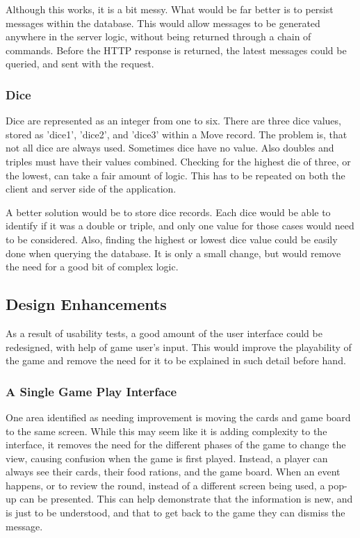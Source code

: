 Although this works, it is a bit messy. What would be far better is to persist messages within the database. This would allow messages to be generated anywhere in the server logic, without being returned through a chain of commands. Before the HTTP response is returned, the latest messages could be queried, and sent with the request.

\subsubsection{Dice}
Dice are represented as an integer from one to six. There are three dice values, stored as 'dice1', 'dice2', and 'dice3' within a Move record. The problem is, that not all dice are always used. Sometimes dice have no value. Also doubles and triples must have their values combined. Checking for the highest die of three, or the lowest, can take a fair amount of logic. This has to be repeated on both the client and server side of the application.

A better solution would be to store dice records. Each dice would be able to identify if it was a double or triple, and only one value for those cases would need to be considered. Also, finding the highest or lowest dice value could be easily done when querying the database. It is only a small change, but would remove the need for a good bit of complex logic.

\subsection{Design Enhancements}
As a result of usability tests, a good amount of the user interface could be redesigned, with help of game user's input. This would improve the playability of the game and remove the need for it to be explained in such detail before hand.

\subsubsection{A Single Game Play Interface}
One area identified as needing improvement is moving the cards and game board to the same screen. While this may seem like it is adding complexity to the interface, it removes the need for the different phases of the game to change the view, causing confusion when the game is first played. Instead, a player can always see their cards, their food rations, and the game board. When an event happens, or to review the round, instead of a different screen being used, a pop-up can be presented. This can help demonstrate that the information is new, and is just to be understood, and that to get back to the game they can dismiss the message.

